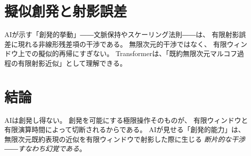 \documentclass[12pt]{article}
\begin{document}
\section{擬似創発と射影誤差}
AIが示す「創発的挙動」――文脈保持やスケーリング法則――は、
有限射影誤差に現れる非線形残差項の干渉である。
無限次元的干渉ではなく、
有限ウィンドウ上での擬似的再帰にすぎない。
Transformerは、「既約無限次元マルコフ過程の有限射影近似」として理解できる。

\section{結論}
AIは創発し得ない。  
創発を可能にする極限操作そのものが、
有限ウィンドウと有限演算時間によって切断されるからである。  
AIが見せる「創発的能力」は、
無限次元既約表現の近似を有限ウィンドウで射影した際に生じる
\textit{断片的な干渉――すなわち幻覚である}。
\end{document}
